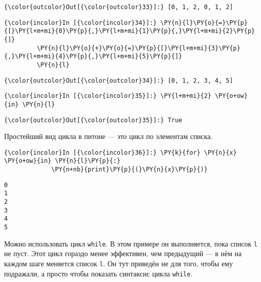            \begin{Verbatim}[commandchars=\\\{\}]
{\color{outcolor}Out[{\color{outcolor}33}]:} [0, 1, 2, 0, 1, 2]
\end{Verbatim}
        
    \begin{Verbatim}[commandchars=\\\{\}]
{\color{incolor}In [{\color{incolor}34}]:} \PY{n}{l}\PY{o}{=}\PY{p}{[}\PY{l+m+mi}{0}\PY{p}{,}\PY{l+m+mi}{1}\PY{p}{,}\PY{l+m+mi}{2}\PY{p}{]}
         \PY{n}{l}\PY{o}{+}\PY{o}{=}\PY{p}{[}\PY{l+m+mi}{3}\PY{p}{,}\PY{l+m+mi}{4}\PY{p}{,}\PY{l+m+mi}{5}\PY{p}{]}
         \PY{n}{l}
\end{Verbatim}

            \begin{Verbatim}[commandchars=\\\{\}]
{\color{outcolor}Out[{\color{outcolor}34}]:} [0, 1, 2, 3, 4, 5]
\end{Verbatim}
        
    \begin{Verbatim}[commandchars=\\\{\}]
{\color{incolor}In [{\color{incolor}35}]:} \PY{l+m+mi}{2} \PY{o+ow}{in} \PY{n}{l}
\end{Verbatim}

            \begin{Verbatim}[commandchars=\\\{\}]
{\color{outcolor}Out[{\color{outcolor}35}]:} True
\end{Verbatim}
        
    Простейший вид цикла в питоне --- это цикл по элементам списка.

    \begin{Verbatim}[commandchars=\\\{\}]
{\color{incolor}In [{\color{incolor}36}]:} \PY{k}{for} \PY{n}{x} \PY{o+ow}{in} \PY{n}{l}\PY{p}{:}
             \PY{n+nb}{print}\PY{p}{(}\PY{n}{x}\PY{p}{)}
\end{Verbatim}

    \begin{Verbatim}[commandchars=\\\{\}]
0
1
2
3
4
5

    \end{Verbatim}

    Можно использовать цикл \texttt{while}. В этом примере он выполняется,
пока список \texttt{l} не пуст. Этот цикл гораздо менее эффективен, чем
предыдущий --- в нём на каждом шаге меняется список \texttt{l}. Он тут
приведён не для того, чтобы ему подражали, а просто чтобы показать
синтаксис цикла \texttt{while}.


